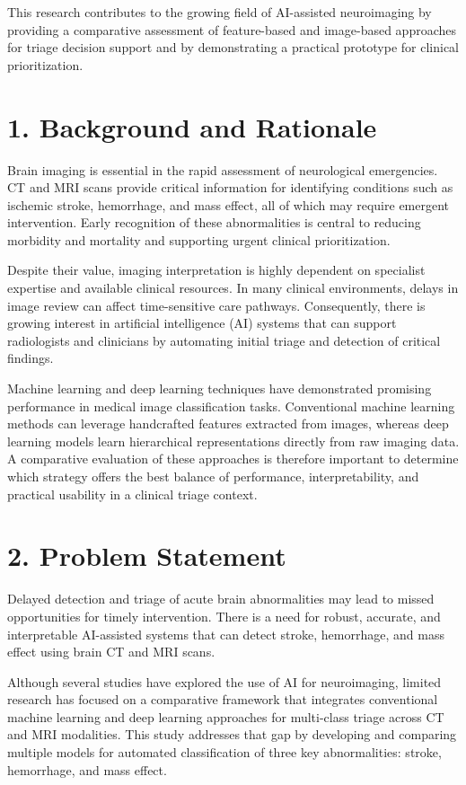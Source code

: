 \documentclass[12pt,a4paper]{report}
\begin{document}
This research contributes to the growing field of AI-assisted neuroimaging by providing a comparative assessment of feature-based and image-based approaches for triage decision support and by demonstrating a practical prototype for clinical prioritization.


\section{1. Background and Rationale}

Brain imaging is essential in the rapid assessment of neurological emergencies. CT and MRI scans provide critical information for identifying conditions such as ischemic stroke, hemorrhage, and mass effect, all of which may require emergent intervention. Early recognition of these abnormalities is central to reducing morbidity and mortality and supporting urgent clinical prioritization.

Despite their value, imaging interpretation is highly dependent on specialist expertise and available clinical resources. In many clinical environments, delays in image review can affect time-sensitive care pathways. Consequently, there is growing interest in artificial intelligence (AI) systems that can support radiologists and clinicians by automating initial triage and detection of critical findings.

Machine learning and deep learning techniques have demonstrated promising performance in medical image classification tasks. Conventional machine learning methods can leverage handcrafted features extracted from images, whereas deep learning models learn hierarchical representations directly from raw imaging data. A comparative evaluation of these approaches is therefore important to determine which strategy offers the best balance of performance, interpretability, and practical usability in a clinical triage context.


\section{2. Problem Statement}

Delayed detection and triage of acute brain abnormalities may lead to missed opportunities for timely intervention. There is a need for robust, accurate, and interpretable AI-assisted systems that can detect stroke, hemorrhage, and mass effect using brain CT and MRI scans.

Although several studies have explored the use of AI for neuroimaging, limited research has focused on a comparative framework that integrates conventional machine learning and deep learning approaches for multi-class triage across CT and MRI modalities. This study addresses that gap by developing and comparing multiple models for automated classification of three key abnormalities: stroke, hemorrhage, and mass effect.
\end{document}
